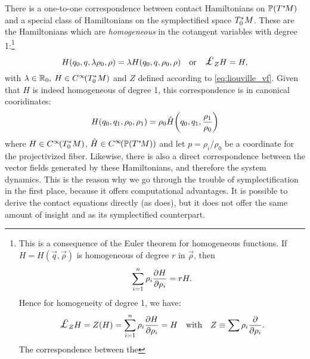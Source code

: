 There is a one-to-one correspondence between contact Hamiltonians on $\mathbb{P}\qty(T^*\!M)$ and a special class of Hamiltonians on the symplectified space $T^*_0M$. These are the Hamiltonians which are \emph{homogeneous} in the cotangent variables with degree 1:\footnote
{This is a consequence of the Euler theorem for homogeneous functions. If $H = H(\vec{q}, \vec{\rho})$ is homogeneous of degree $r$ in $\vec{\rho}$, then
    $$ \sum_{i = 1}^n \rho_i \pdv{H}{\rho_i} = r H. $$
 Hence for homogeneity of degree 1, we have: 
 $$ \lied{Z}{H} = Z(H) = \sum_{i=1}^n \rho_i \pdv{H}{\rho_i} = H \quad \text{with}\quad Z \equiv \sum \rho_i \pdv{}{\rho_i}. $$
 The correspondence between the 
}
\begin{equation}
    H(q_0, q, \lambda \rho_0, \rho) = \lambda H(q_0, q, \rho_0, \rho) \quad \text{or} \quad \lied{Z}{H} = H,
\end{equation}
with $\lambda \in \mathbb{R}_0,\: H \in C^\infty\!\qty(T^*_0M)$ and $Z$ defined according to \cref{eq:liouville_vf}. Given that $H$ is indeed homogeneous of degree 1, this correspondence is in canonical cooridinates:
\begin{equation}
    H(q_0, q_1, \rho_0, \rho_1) = \rho_0 \hat{H}\qty(q_0, q_1, \frac{\rho_1}{\rho_0})
    \label{eq:H_correspondence}
\end{equation}
where $H \in C^\infty\!\qty(T^*_0M)$, $\hat{H} \in C^\infty\!\qty(\mathbb{P}\qty(T^*\!M))$ and let $p = \rho_i / \rho_0$ be a coordinate for the projectivized fiber. Likewise, there is also a direct correspondence between the vector fields generated by these Hamiltonians, and therefore the system dynamics. This is the reason why we go through the trouble of symplectification in the first place, because it offers computational advantages. It is possible to derive the contact equations directly (as \citet{Bravetti2017} does), but it does not offer the same amount of insight and as its symplectified counterpart. \cite{VanderSchaft2021a,Arnold1989}

